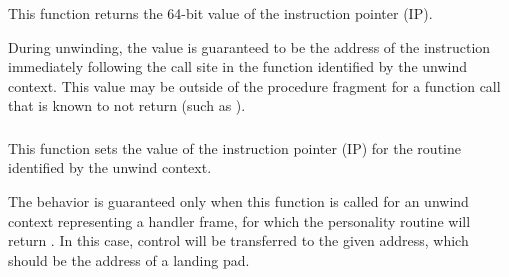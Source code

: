 \subsubsection{}


This function returns the 64-bit value of the instruction pointer (IP).

During unwinding, the value is guaranteed to be the address of the
instruction immediately following the call site in the function
identified by the unwind context. This value may be outside of the
procedure fragment for a function call that is known to not return
(such as ).

\subsubsection{}

This function sets the value of the instruction pointer (IP) for the
routine identified by the unwind context.

The behavior is guaranteed only when this function is called for an
unwind context representing a handler frame, for which the personality
routine will return . In this case, control will
be transferred to the given address, which should be the address of a
landing pad.

\subsubsection{}


